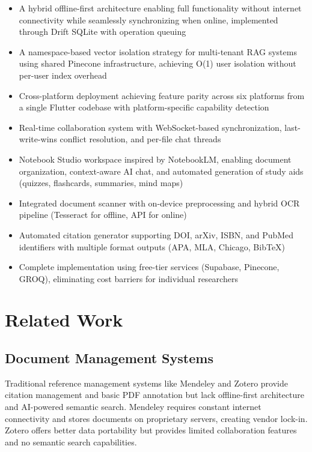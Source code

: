 \documentclass[conference]{IEEEtran}
\begin{document}
\begin{itemize}
\item A hybrid offline-first architecture enabling full functionality without internet connectivity while seamlessly synchronizing when online, implemented through Drift SQLite with operation queuing
\item A namespace-based vector isolation strategy for multi-tenant RAG systems using shared Pinecone infrastructure, achieving O(1) user isolation without per-user index overhead
\item Cross-platform deployment achieving feature parity across six platforms from a single Flutter codebase with platform-specific capability detection
\item Real-time collaboration system with WebSocket-based synchronization, last-write-wins conflict resolution, and per-file chat threads
\item Notebook Studio workspace inspired by NotebookLM, enabling document organization, context-aware AI chat, and automated generation of study aids (quizzes, flashcards, summaries, mind maps)
\item Integrated document scanner with on-device preprocessing and hybrid OCR pipeline (Tesseract for offline, API for online)
\item Automated citation generator supporting DOI, arXiv, ISBN, and PubMed identifiers with multiple format outputs (APA, MLA, Chicago, BibTeX)
\item Complete implementation using free-tier services (Supabase, Pinecone, GROQ), eliminating cost barriers for individual researchers
\end{itemize}


\section{Related Work}

\subsection{Document Management Systems}

Traditional reference management systems like Mendeley \cite{b1} and Zotero \cite{b2} provide citation management and basic PDF annotation but lack offline-first architecture and AI-powered semantic search. Mendeley requires constant internet connectivity and stores documents on proprietary servers, creating vendor lock-in. Zotero offers better data portability but provides limited collaboration features and no semantic search capabilities.
\end{document}
